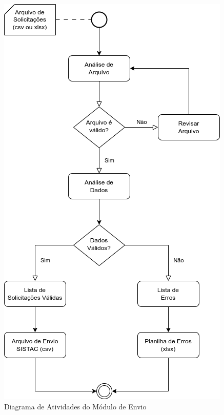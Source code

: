 \documentclass[
	12pt,			%
	openright,		%
	oneside,	
	a4paper,		%
	english,		%
	brazil			%
]{abntex2/abntex2}  %
\begin{document}
		\clearpage
		\begin{figure}[!ht]
			\begin{center}
				
				\caption{Diagrama de Atividades do Módulo de Envio}
				\includegraphics[scale=0.75]{img/diagrama-ativs-envio}
				
			\end{center}
		\end{figure}
		
\end{document}

